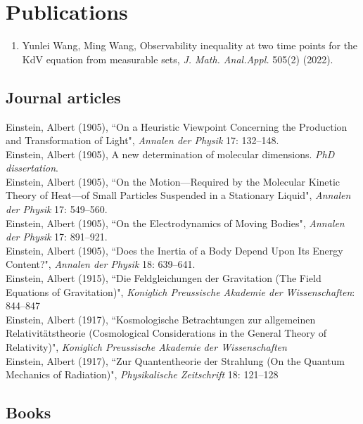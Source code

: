 \documentclass[11pt]{article} %
\begin{document}
\section*{Publications}
\begin{enumerate}
\leftskip-0.13in
\item Yunlei Wang, Ming Wang, Observability inequality at two time points for the KdV equation from measurable sets, \emph{J. Math. Anal.Appl.} 505(2) (2022).
\end{enumerate}
\iffalse
\subsection*{Journal articles}


Einstein, Albert (1905), “On a Heuristic Viewpoint Concerning the Production and Transformation of Light", \emph{Annalen der Physik} 17: 132–148.\\
Einstein, Albert (1905), A new determination of molecular dimensions. \emph{PhD dissertation}.\\
Einstein, Albert (1905), “On the Motion—Required by the Molecular Kinetic Theory of Heat—of Small Particles Suspended in a Stationary Liquid", \emph{Annalen der Physik} 17: 549–560.\\
Einstein, Albert (1905), “On the Electrodynamics of Moving Bodies", \emph{Annalen der Physik} 17: 891–921.\\
Einstein, Albert (1905), “Does the Inertia of a Body Depend Upon Its Energy Content?", \emph{Annalen der Physik} 18: 639–641.\\
Einstein, Albert (1915), “Die Feldgleichungen der Gravitation (The Field Equations of Gravitation)", \emph{Koniglich Preussische Akademie der Wissenschaften}: 844–847\\
Einstein, Albert (1917), “Kosmologische Betrachtungen zur allgemeinen Relativitätstheorie (Cosmological Considerations in the General Theory of Relativity)", \emph{Koniglich Preussische Akademie der Wissenschaften}\\
Einstein, Albert (1917), “Zur Quantentheorie der Strahlung (On the Quantum Mechanics of Radiation)", \emph{Physikalische Zeitschrift} 18: 121–128


\subsection*{Books}
\end{document}
